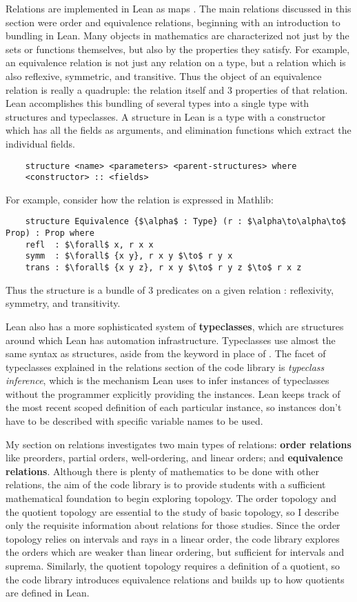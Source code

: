 Relations are implemented in Lean as maps . The 
main relations discussed in this section were order and equivalence relations,
beginning with an introduction to bundling in Lean. Many objects in 
mathematics are characterized not just by the sets or functions themselves,
but also by the properties they satisfy. For example, an equivalence relation
is not just any relation on a type, but a relation which is also reflexive, 
symmetric, and transitive. Thus the object of an equivalence relation is really
a quadruple: the relation itself and 3 properties of that relation. Lean accomplishes
this bundling of several types into a single type with structures and typeclasses.
A structure in Lean is a type with a constructor which has all the fields
as arguments, and elimination functions which extract the individual fields.
\begin{lstlisting}
    structure <name> <parameters> <parent-structures> where
    <constructor> :: <fields>
\end{lstlisting}
For example, consider how the  relation is expressed in Mathlib:
\begin{lstlisting}
    structure Equivalence {$\alpha$ : Type} (r : $\alpha\to\alpha\to$ Prop) : Prop where
    refl  : $\forall$ x, r x x
    symm  : $\forall$ {x y}, r x y $\to$ r y x
    trans : $\forall$ {x y z}, r x y $\to$ r y z $\to$ r x z
\end{lstlisting}
Thus the structure  is a bundle of 3 predicates on a given
relation : reflexivity, symmetry, and transitivity.

Lean also has a more sophisticated system of \textbf{typeclasses}, which are
structures around which Lean has automation infrastructure. Typeclasses use 
almost the same syntax as structures, aside from the keyword  in
place of . The facet of typeclasses explained in the relations
section of the code library is \textit{typeclass inference}, which is the
mechanism Lean uses to infer instances of typeclasses without the programmer
explicitly providing the instances. Lean keeps track of the most recent scoped 
definition of each particular instance, so instances don't have to be described
with specific variable names to be used. 

My section on relations investigates two main types of relations: 
\textbf{order relations} like preorders, partial orders, well-ordering, 
and linear orders; and \textbf{equivalence relations}. Although there is 
plenty of mathematics to be done with other relations, the aim of the code library is to
provide students with a sufficient mathematical foundation to begin exploring topology.
The order topology and the quotient topology are essential to the study of basic topology, 
so I describe only the requisite information about relations for those studies. Since the order 
topology relies on intervals and rays in a linear order, the code library explores the orders
which are weaker than linear ordering, but sufficient for intervals and suprema. Similarly, 
the quotient topology requires a definition of a quotient, so the code library introduces equivalence
relations and builds up to how quotients are defined in Lean.

